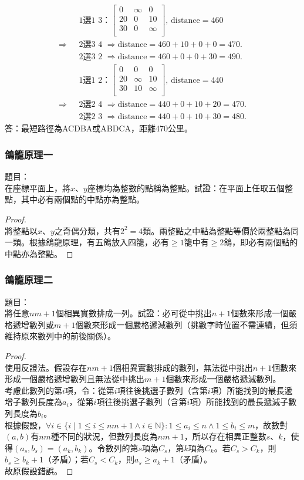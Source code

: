\documentclass[a4paper,12pt]{report}
\begin{document}
\[
\begin{aligned}
& \text{1選1 3：}
\begin{bmatrix}
0 & \infty & 0 \\
20 & 0 & 10 \\
30 & 0 & \infty \\
\end{bmatrix}
\text{, distance}=460 \\
\Rightarrow\text{ } & \text{2選3 4 } \Rightarrow \text{distance}=460+10+0+0=470. \\
& \text{2選3 2 } \Rightarrow \text{distance}=460+0+0+30=490. \\
& \text{1選1 2：}
\begin{bmatrix}
0 & 0 & 0 \\
20 & \infty & 10 \\
30 & 10 & \infty \\
\end{bmatrix}
\text{, distance}=440 \\
\Rightarrow\text{ } & \text{2選2 4 } \Rightarrow \text{distance}=440+0+10+20=470. \\
& \text{2選2 3 } \Rightarrow \text{distance}=440+0+10+30=480.
\end{aligned}
\]
答：最短路徑為ACDBA或ABDCA，距離470公里。
\subsubsection{鴿籠原理一}
題目：\\
在座標平面上，將$x$、$y$座標均為整數的點稱為整點。試證：在平面上任取五個整點，其中必有兩個點的中點亦為整點。
\begin{proof}\mbox{}\\
將整點以$x$、$y$之奇偶分類，共有$2^2=4$類。兩整點之中點為整點等價於兩整點為同一類。根據鴿龍原理，有五鴿放入四籠，必有$\geq 1$籠中有$\geq 2$鴿，即必有兩個點的中點亦為整點。
\end{proof}
\subsubsection{鴿籠原理二}
題目：\\
將任意$nm+1$個相異實數排成一列。試證：必可從中挑出$n+1$個數來形成一個嚴格遞增數列或$m+1$個數來形成一個嚴格遞減數列（挑數字時位置不需連續，但須維持原來數列中的前後關係）。
\begin{proof}\mbox{}\\
使用反證法。假設存在$nm+1$個相異實數排成的數列，無法從中挑出$n+1$個數來形成一個嚴格遞增數列且無法從中挑出$m+1$個數來形成一個嚴格遞減數列。 \\
考慮此數列的第$i$項，令：從第$i$項往後挑選子數列（含第$i$項）所能找到的最長遞增子數列長度為$a_i$，從第$i$項往後挑選子數列（含第$i$項）所能找到的最長遞減子數列長度為$b_i$。 \\
根據假設，$\forall i\in \{i\mid 1\leq i\leq nm+1\wedge i\in\mathbb{N}\}: 1\leq a_i\leq n\wedge 1\leq b_i\leq m$，故數對$(a, b)$有$nm$種不同的狀況，但數列長度為$nm+1$，所以存在相異正整數$s$、$k$，使得$(a_s, b_s) = (a_k, b_k)$。令數列的第$s$項為$C_s$，第$k$項為$C_k$。若$C_s > C_k$，則$b_s\geq b_k+1$（矛盾）；若$C_s<C_k$，則$a_s\geq a_k+1$（矛盾）。 \\
故原假設錯誤。
\end{proof}
\end{document}
